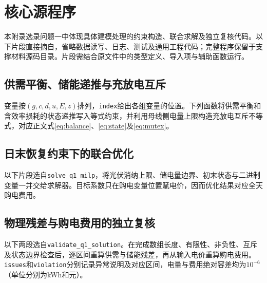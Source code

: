 \section{核心源程序}
本附录选录问题一中体现具体建模处理的约束构造、联合求解及独立复核代码。以下片段直接摘自，省略数据读写、日志、测试及通用工程代码；完整程序保留于支撑材料源码目录。片段需结合原文件中的类型定义、导入项与辅助函数运行。

\subsection{供需平衡、储能递推与充放电互斥}
变量按$(g,c,d,u,E,z)$排列，\texttt{index}给出各组变量的位置。下列函数将供需平衡和含效率损耗的状态递推写入等式约束，并利用母线侧电量上限构造充放电互斥不等式，对应正文式\eqref{eq:balance}、\eqref{eq:state}及\eqref{eq:mutex}。

\subsection{日末恢复约束下的联合优化}
以下片段选自\texttt{solve\_q1\_milp}，将光伏消纳上限、储电量边界、初末状态与二进制变量一并交给求解器。目标系数只在购电变量位置赋电价，因而优化结果对应全天购电费用。

\subsection{物理残差与购电费用的独立复核}
以下两段选自\texttt{validate\_q1\_solution}。在完成数组长度、有限性、非负性、互斥及状态边界检查后，逐区间重算供需与储能残差，再从输入电价重算购电费用。\texttt{issues}和\texttt{violation}分别记录异常说明及对应区间，电量与费用绝对容差均为$10^{-6}$（单位分别为kWh和元）。
